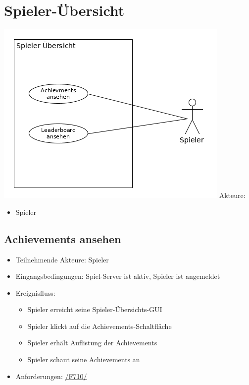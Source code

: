 \documentclass[a4paper]{scrreprt}
\begin{document}
    \section{Spieler-Übersicht}
    \includegraphics[width=\textwidth]{uml/export/Spieler_Ubersicht.png}
    Akteure: 
    \begin{itemize}
    \item \Gls{Spieler}
    \end{itemize}

    \subsection{Achievements ansehen}
    \begin{itemize}
        \item Teilnehmende Akteure: \Gls{Spieler}
        \item Eingangsbedingungen: \Gls{Spiel-Server} ist aktiv, \Gls{Spieler} ist angemeldet
        \item Ereignisfluss:
        \begin{itemize}
            \item \Gls{Spieler} erreicht seine Spieler-Übersichts-GUI
            \item \Gls{Spieler} klickt auf die Achievements-Schaltfläche %
            \item \Gls{Spieler} erhält Auflistung der Achievements
            \item \Gls{Spieler} schaut seine Achievements an
        \end{itemize}
        \item Anforderungen: \hyperlink{F710}{/F710/}
    \end{itemize}
\end{document}

